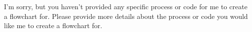 I'm sorry, but you haven't provided any specific process or code for me to create a flowchart for. Please provide more details about the process or code you would like me to create a flowchart for.